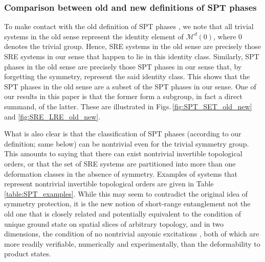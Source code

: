 \documentclass[sort&compress]{elsarticle}
\theoremstyle{theoremstyle}
\theoremstyle{framedtheoremstyle}
\theoremstyle{definitionstyle}
\theoremstyle{definitionstyle}
\theoremstyle{definitionstyle}
\theoremstyle{definitionstyle}
\theoremstyle{nameddefinitionstyle}
\theoremstyle{framednameddefinitionstyle}
\theoremstyle{proofstyle}
\theoremstyle{definitionstyle}
\newcommand{\M}{\mathcal{M}}
\begin{document}
\subsubsection{Comparison between old and new definitions of SPT phases\label{subsubsec:comparison_definition_SPT_phases}}

To make contact with the old definition of SPT phases \cite{Wen_Definition, Cirac}, we note that all trivial systems in the old sense represent the identity element of $\M^d(0)$, where $0$ denotes the trivial group. Hence, SRE systems in the old sense are precisely those SRE systems in our sense that happen to lie in this identity class. Similarly, SPT phases in the old sense are precisely those SPT phases in our sense that, by forgetting the symmetry, represent the said identity class. This shows that the SPT phases in the old sense are a subset of the SPT phases in our sense. One of our results in this paper is that the former form a subgroup, in fact a direct summand, of the latter. These are illustrated in Figs.\,\ref{fig:SPT_SET_old_new} and \ref{fig:SRE_LRE_old_new}.

What is also clear is that the classification of SPT phases (according to our definition; same below) can be nontrivial even for the trivial symmetry group. This amounts to saying that there can exist nontrivial invertible topological orders, or that the set of SRE systems are partitioned into more than one deformation classes in the absence of symmetry. Examples of systems that represent nontrivial invertible topological orders are given in Table \ref{table:SPT_examples}. While this may seem to contradict the original idea \cite{Wen_Definition} of symmetry protection, it is the new notion of short-range entanglement not the old one that is closely related and potentially equivalent to the condition of unique ground state on spatial slices of arbitrary topology, and in two dimensions, the condition of no nontrivial anyonic excitations \cite{Kitaev_Stony_Brook_2011_SRE_2, Kitaev_Stony_Brook_2013_SRE, Kapustin_Boson, Freed_SRE_iTQFT, Freed_ReflectionPositivity, McGreevy_sSourcery, Wen_review_2016}, both of which are more readily verifiable, numerically and experimentally, than the deformability to product states.
\end{document}
